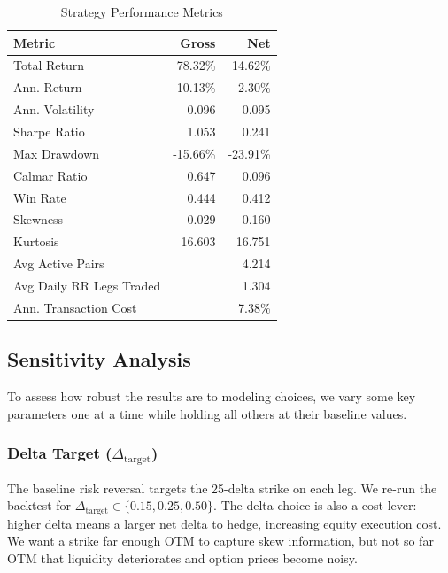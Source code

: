 \documentclass[12pt, a4paper]{article}
\begin{document}
\begin{table}[h]
\centering
\begin{tabular}{lrr}
\toprule
\textbf{Metric} & \textbf{Gross} & \textbf{Net} \\
\midrule
Total Return & 78.32\% & 14.62\% \\
Ann. Return & 10.13\% & 2.30\% \\
Ann. Volatility & 0.096 & 0.095 \\
Sharpe Ratio & 1.053 & 0.241 \\
Max Drawdown & -15.66\% & -23.91\% \\
Calmar Ratio & 0.647 & 0.096 \\
Win Rate & 0.444 & 0.412 \\
Skewness & 0.029 & -0.160 \\
Kurtosis & 16.603 & 16.751 \\
\midrule
Avg Active Pairs & \multicolumn{2}{r}{4.214} \\
Avg Daily RR Legs Traded & \multicolumn{2}{r}{1.304} \\
Ann. Transaction Cost & \multicolumn{2}{r}{7.38\%} \\
\bottomrule
\end{tabular}
\caption{Strategy Performance Metrics}
\label{tab:metrics}
\end{table}




\subsection{Sensitivity Analysis}
\label{sec:sensitivity}

To assess how robust the results are to modeling choices, we vary some key parameters one at a time while holding all others at their baseline values.

\subsubsection{Delta Target ($\Delta_{\mathrm{target}}$)}

The baseline risk reversal targets the 25-delta strike on each leg. We re-run the backtest for $\Delta_{\mathrm{target}} \in \{0.15, 0.25, 0.50\}$. The delta choice is also a cost lever: higher delta means a larger net delta to hedge, increasing equity execution cost. We want a strike far enough OTM to capture skew information, but not so far OTM that liquidity deteriorates and option prices become noisy.
\end{document}
